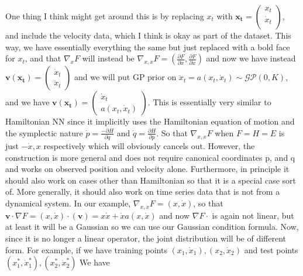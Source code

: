 \documentclass{article}
\begin{document}
One thing I think might get around this is by replacing $x_t$ with 
$\mathbf{x_t}=\begin{pmatrix}
  x_t\\
  \dot{x}_t\\
\end{pmatrix}$, and include the velocity data, which I think is okay as part of the dataset.
This way, we have essentially everything the same but just replaced with a bold face for $x_t$, and that $\nabla_xF$ will instead be $\nabla_{x,\dot{x}}F=\left(\frac{\partial F}{\partial x}, \frac{\partial F}{\partial \dot{x}}\right)$ and now we have instead $\mathbf{v}(\mathbf{x_t})=\begin{pmatrix}
  \dot{x}_t\\
  \ddot{x}_t
\end{pmatrix}$ and we will put GP prior on $\ddot{x}_t = a(x_t, \dot{x}_t) \sim \mathcal{GP}(0, K)$, and we have $\mathbf{v}(\mathbf{x_t})=\begin{pmatrix}
  \dot{x}_t \\
  a(x_t, \dot{x}_t)
\end{pmatrix}$.
This is essentially very similar to Hamiltonian NN since it implicitly uses the Hamiltonian equation of motion and the symplectic nature $\dot{p}=\frac{-\partial H}{\partial q}$ and $\dot{q}=\frac{\partial H}{\partial p}$.
So that $\nabla_{x, \dot{x}} F$ when $F=H=E$ is just $-\dot{x}, x$ respectively which will obviously cancels out. 
However, the construction is more general and does not require canonical coordinates p, and q and works on observed position and velocity alone. 
Furthermore, in principle it should also work on cases other than Hamiltonian so that it is a special case sort of. 
More generally, it should also work on time series data that is not from a dynamical system. 
\newline
In our example, $\nabla_{x,\dot{x}}F=\left(x, \dot{x}\right)$, so that $\mathbf{v}\cdot\nabla F=\left(x, \dot{x}\right)\cdot\left(\mathbf{v}\right) = x\dot{x} + \dot{x}a(x, \dot{x})$ and now $\nabla F\cdot$ is again not linear, but at least it will be a Gaussian so we can use our Gaussian condition formula.
Now, since it is no longer a linear operator, the joint distribution will be of different form. 
For example, if we have training points $(x_1, \dot{x}_1), (x_2, \dot{x}_2)$ and test points $(x^*_1, \dot{x}^*_1), (x^*_2, \dot{x}^*_2)$
We have 
\end{document}
